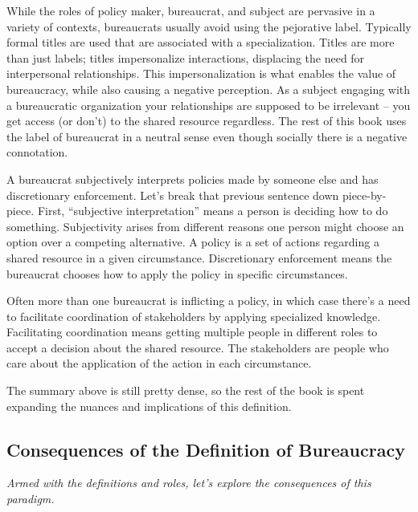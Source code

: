 While the roles of policy maker, bureaucrat, and subject are pervasive in a variety of contexts, bureaucrats usually avoid using the pejorative label. Typically formal titles are used that are associated with a specialization. Titles are more than just labels; titles impersonalize interactions, displacing the need for interpersonal relationships. This impersonalization is what enables the value of bureaucracy, while also causing a negative perception. As a subject engaging with a bureaucratic organization your relationships are supposed to be irrelevant -- you get access (or don't) to the shared resource regardless. The rest of this book uses the label of bureaucrat in a neutral sense even though socially there is a negative connotation.  

A \gls{bureaucrat} subjectively interprets policies made by someone else and has discretionary enforcement.  
Let's break that previous sentence down piece-by-piece. First, ``subjective interpretation'' means a person is deciding how to do something. Subjectivity arises from different reasons one person might choose an option over a competing alternative.  A \gls{policy} 
is a set of actions regarding a shared resource in a given circumstance. 
Discretionary enforcement means the bureaucrat chooses how to apply the policy in specific circumstances. 

Often more than one bureaucrat is inflicting a policy, in which case there's a need to facilitate coordination of stakeholders by applying specialized knowledge. 
Facilitating coordination means getting multiple people in different roles
to accept a decision about the shared resource. The stakeholders are people who care about the application of the action in each circumstance.  


The summary above is still pretty dense, so the rest of the book is spent expanding the nuances and implications of this definition.

\subsection*{Consequences of the Definition of Bureaucracy}

\textit{Armed with the definitions and roles, let's explore the consequences of this paradigm.}

